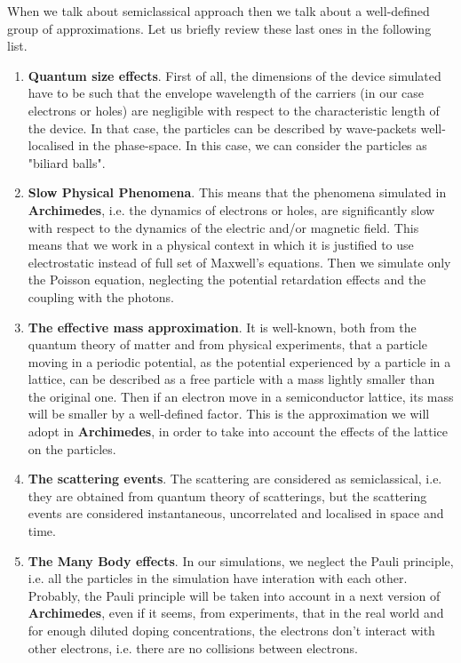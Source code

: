 \documentclass[12pt]{book}
\begin{document}
When we talk about semiclassical approach then we talk about a well-defined group of approximations. Let us briefly review these last ones in the following list.
\begin{enumerate}
\item
\textbf{Quantum size effects}. First of all, the dimensions of the device simulated have to be such that the envelope wavelength of the carriers (in our case electrons or holes) are negligible with respect to the characteristic length of the device. In that case, the particles can be described by wave-packets well-localised in the phase-space. In this case, we can consider the particles as "biliard balls".

\item
\textbf{Slow Physical Phenomena}. This means that the phenomena simulated in \textbf{Archimedes}, i.e. the dynamics of electrons or holes, are significantly slow with respect to the dynamics of the electric and/or magnetic field. This means that we work in a physical context in which it is justified to use electrostatic instead of full set of Maxwell's equations. Then we simulate only the Poisson equation, neglecting the potential retardation effects and the coupling with the photons.

\item
\textbf{The effective mass approximation}. It is well-known, both from the quantum theory of matter and from physical experiments, that a particle moving in a periodic potential, as the potential experienced by a particle in a lattice, can be described as a free particle with a mass lightly smaller than the original one. Then if an electron move in a semiconductor lattice, its mass will be smaller by a well-defined factor. This is the approximation we will adopt in \textbf{Archimedes}, in order to take into account the effects of the lattice on the particles.

\item
\textbf{The scattering events}. The scattering are considered as semiclassical, i.e. they are obtained from quantum theory of scatterings, but the scattering events are considered instantaneous, uncorrelated and localised in space and time.

\item
\textbf{The Many Body effects}. In our simulations, we neglect the Pauli principle, i.e. all the particles in the simulation have interation with each other. Probably, the Pauli principle will be taken into account in a next version of \textbf{Archimedes}, even if it seems, from experiments, that in the real world and for enough diluted doping concentrations, the electrons don't interact with other electrons, i.e. there are no collisions between electrons.
\end{enumerate}
\end{document}
